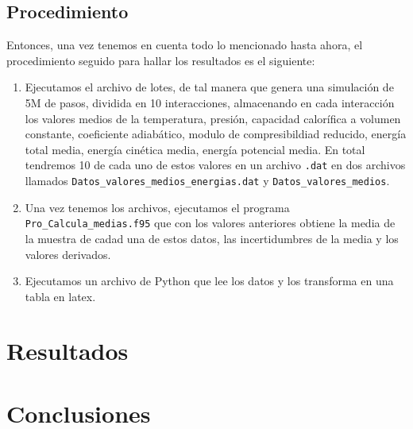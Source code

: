 \documentclass[11pt]{article} %
\begin{document}
\subsection{Procedimiento}

Entonces, una vez tenemos en cuenta todo lo mencionado hasta ahora, el procedimiento seguido para hallar los resultados es el siguiente:

\begin{enumerate}
	\item Ejecutamos el archivo de lotes, de tal manera que genera una simulación de 5M de pasos, dividida en 10 interacciones, almacenando en cada interacción los valores medios de la temperatura, presión, capacidad calorífica a volumen constante, coeficiente adiabático, modulo de compresibildiad reducido, energía total media, energía cinética media, energía potencial media. En total tendremos 10 de cada uno de estos valores en un archivo \texttt{.dat} en dos archivos llamados \texttt{Datos\_valores\_medios\_energias.dat} y \texttt{Datos\_valores\_medios}.
	
	\item Una vez tenemos los archivos, ejecutamos el programa \texttt{Pro\_Calcula\_medias.f95} que con los valores anteriores obtiene la media de la muestra de cadad una de estos datos, las incertidumbres de la media y los valores derivados. 
	
	\item Ejecutamos un archivo de Python que lee los datos y los transforma en una tabla en latex. 
\end{enumerate}


\section{Resultados}

\section{Conclusiones}




	
\end{document}
